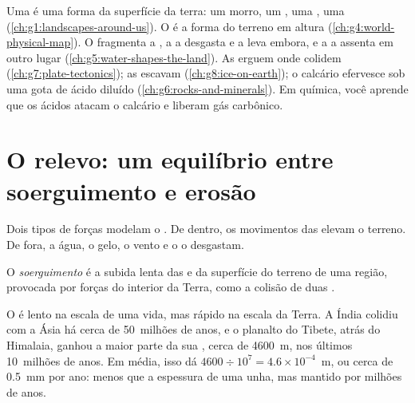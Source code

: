 \begin{recall}
Uma \emph{} é uma forma da superfície da terra: um morro,
um , uma , uma  (\cref{ch:g1:landscapes-around-us}). O
 é a forma do terreno em altura (\cref{ch:g4:world-physical-map}).
O  fragmenta a , a  a desgasta e a leva embora, e a
 a assenta em outro lugar (\cref{ch:g5:water-shapes-the-land}).
As  erguem  onde colidem (\cref{ch:g7:plate-tectonics});
as  escavam  (\cref{ch:g8:ice-on-earth}); o calcário
efervesce sob uma gota de ácido diluído (\cref{ch:g6:rocks-and-minerals}).
Em química, você aprende que os ácidos atacam o calcário e liberam gás
carbônico.
\end{recall}

\section{O relevo: um equilíbrio entre soerguimento e erosão}

Dois tipos de forças modelam o . De dentro, os movimentos das 
elevam o terreno. De fora, a água, o gelo, o vento e o  o desgastam.

\begin{definition}[Soerguimento]\label{def:g9:landforms:uplift}
O \emph{soerguimento} é a subida lenta das  e da
superfície do terreno de uma região, provocada por forças do interior da
Terra, como a colisão de duas .
\end{definition}

O  é lento na escala de uma vida, mas rápido na escala da
Terra. A Índia colidiu com a Ásia há cerca de 50~milhões de anos, e o
planalto do Tibete, atrás do Himalaia, ganhou a maior parte da sua
, cerca de \qty{4600}{m}, nos últimos 10~milhões de anos. Em
média, isso dá
$4600 \div 10^7 = 4.6 \times 10^{-4}$~m, ou cerca de \qty{0.5}{mm} por
ano: menos que a espessura de uma unha, mas mantido por milhões de anos.

